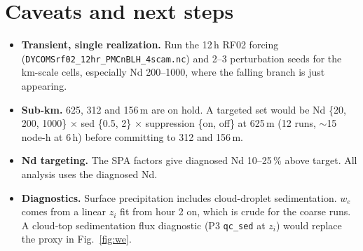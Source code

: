 \documentclass[10pt]{article}
\begin{document}
\section{Caveats and next steps}
\begin{itemize}
\item \textbf{Transient, single realization.} Run the 12\,h RF02 forcing (\texttt{DYCOMSrf02\_12hr\_PMCnBLH\_4scam.nc}) and 2--3 perturbation seeds
for the km-scale cells, especially Nd 200--1000, where the falling branch is just appearing.
\item \textbf{Sub-km.} 625, 312 and 156\,m are on hold. A targeted set would be Nd \{20, 200, 1000\} $\times$ sed \{0.5, 2\} $\times$ suppression \{on, off\}
at 625\,m (12 runs, $\sim$15 node-h at 6\,h) before committing to 312 and 156\,m.
\item \textbf{Nd targeting.} The SPA factors give diagnosed Nd 10--25\,\% above target. All analysis uses the diagnosed Nd.
\item \textbf{Diagnostics.} Surface precipitation includes cloud-droplet sedimentation. $w_e$ comes from a linear $z_i$ fit from hour 2 on, which is crude for the coarse runs.
A cloud-top sedimentation flux diagnostic (P3 \texttt{qc\_sed} at $z_i$) would replace the proxy in Fig.~\ref{fig:we}.
\end{itemize}


\end{document}
